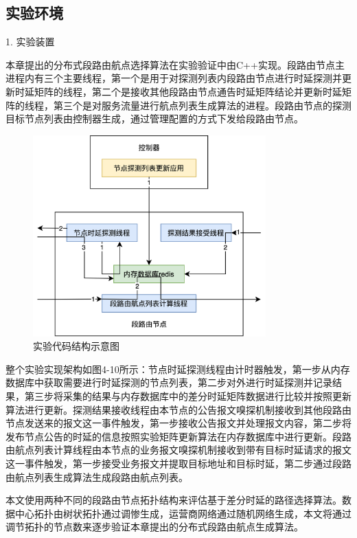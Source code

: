 \subsection{实验环境}

1. 实验装置

本章提出的分布式段路由航点选择算法在实验验证中由C++实现。段路由节点主进程内有三个主要线程，第一个是用于对探测列表内段路由节点进行时延探测并更新时延矩阵的线程，第二个是接收其他段路由节点通告时延矩阵结论并更新时延矩阵的线程，第三个是对服务流量进行航点列表生成算法的进程。段路由节点的探测目标节点列表由控制器生成，通过管理配置的方式下发给段路由节点。

\begin{figure}[htbp]
\setlength{\abovecaptionskip}{15pt plus 3pt minus 2pt}
\centerline{\includegraphics[width=0.8\textwidth]{./figures/ch4-test-code.png}}
\caption{实验代码结构示意图}
\label{fig-ch4-test-code}
\end{figure}
    
整个实验实现架构如图4-10所示：节点时延探测线程由计时器触发，第一步从内存数据库中获取需要进行时延探测的节点列表，第二步对外进行时延探测并记录结果，第三步将采集的结果与内存数据库中的差分时延矩阵数据进行比较并按照更新算法进行更新。探测结果接收线程由本节点的公告报文嗅探机制接收到其他段路由节点发送来的报文这一事件触发，第一步接收公告报文并处理报文内容，第二步将发布节点公告的时延的信息按照实验矩阵更新算法在内存数据库中进行更新。段路由航点列表计算线程由本节点的业务报文嗅探机制接收到带有目标时延请求的报文这一事件触发，第一步接受业务报文并提取目标地址和目标时延，第二步通过段路由航点列表生成算法生成段路由航点列表。

本文使用两种不同的段路由节点拓扑结构来评估基于差分时延的路径选择算法。数据中心拓扑由树状拓扑通过调惨生成，运营商网络通过随机网络生成，本文将通过调节拓扑的节点数来逐步验证本章提出的分布式段路由航点生成算法。

